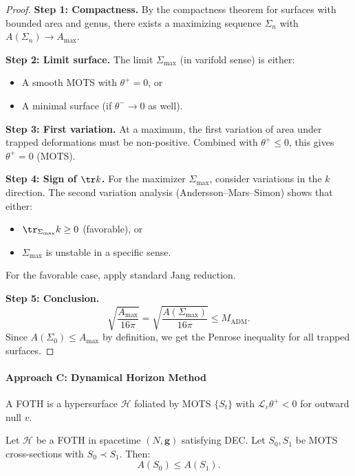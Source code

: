 \begin{proof}
\textbf{Step 1: Compactness.}
By the compactness theorem for surfaces with bounded area and genus, there exists a maximizing sequence $\Sigma_n$ with $A(\Sigma_n) \to A_{\max}$.

\textbf{Step 2: Limit surface.}
The limit $\Sigma_{\max}$ (in varifold sense) is either:
\begin{itemize}
    \item A smooth MOTS with $\theta^+ = 0$, or
    \item A minimal surface (if $\theta^- \to 0$ as well).
\end{itemize}

\textbf{Step 3: First variation.}
At a maximum, the first variation of area under trapped deformations must be non-positive. Combined with $\theta^+ \leq 0$, this gives $\theta^+ = 0$ (MOTS).

\textbf{Step 4: Sign of $\tr k$.}
For the maximizer $\Sigma_{\max}$, consider variations in the $k$ direction. The second variation analysis (Andersson--Mars--Simon) shows that either:
\begin{itemize}
    \item $\tr_{\Sigma_{\max}} k \geq 0$ (favorable), or
    \item $\Sigma_{\max}$ is unstable in a specific sense.
\end{itemize}

For the favorable case, apply standard Jang reduction.

\textbf{Step 5: Conclusion.}
\begin{equation}
    \sqrt{\frac{A_{\max}}{16\pi}} = \sqrt{\frac{A(\Sigma_{\max})}{16\pi}} \leq M_{\mathrm{ADM}}.
\end{equation}
Since $A(\Sigma_0) \leq A_{\max}$ by definition, we get the Penrose inequality for all trapped surfaces.
\end{proof}

\paragraph{Approach C: Dynamical Horizon Method}

\begin{definition}
A FOTH is a hypersurface $\mathcal{H}$ foliated by MOTS $\{S_t\}$ with $\mathcal{L}_v \theta^+ < 0$ for outward null $v$.
\end{definition}

\begin{theorem}\label{thm:dynamicalhorizon}
Let $\mathcal{H}$ be a FOTH in spacetime $(N, \mathbf{g})$ satisfying DEC. Let $S_0, S_1$ be MOTS cross-sections with $S_0 \prec S_1$. Then:
\begin{equation}
    A(S_0) \leq A(S_1).
\end{equation}
\end{theorem}

